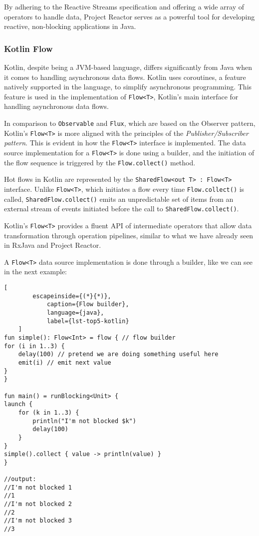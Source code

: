 By adhering to the Reactive Streams specification and offering a wide array of operators to handle data, Project Reactor serves as a powerful tool for developing reactive, non-blocking applications in Java.

\subsubsection{Kotlin Flow}
\label{sec:kotlinflow}

Kotlin, despite being a JVM-based language, differs significantly from Java when it comes to handling asynchronous data flows. Kotlin uses coroutines, a feature natively supported in the language, to simplify asynchronous programming. This feature is used in the implementation of \texttt{Flow<T>}, Kotlin's main interface for handling asynchronous data flows.

In comparison to \texttt{Observable} and \texttt{Flux}, which are based on the Observer pattern, Kotlin's \texttt{Flow<T>} is more aligned with the principles of the \textit{Publisher/Subscriber pattern}. This is evident in how the \texttt{Flow<T>} interface is implemented. The data source implementation for a \texttt{Flow<T>} is done using a builder, and the initiation of the flow sequence is triggered by the \texttt{Flow.collect()} method.

Hot flows in Kotlin are represented by the \texttt{SharedFlow<out T> : Flow<T>} interface. Unlike \texttt{Flow<T>}, which initiates a flow every time \texttt{Flow.collect()} is called, \texttt{SharedFlow.collect()} emits an unpredictable set of items from an external stream of events initiated before the call to \texttt{SharedFlow.collect()}. 

Kotlin's \texttt{Flow<T>} provides a fluent API of intermediate operators that allow data transformation through operation pipelines, similar to what we have already seen in RxJava and Project Reactor. 

A \texttt{Flow<T>} data source implementation is done through a builder, like we can see in the next example:


\begin{center}
	\lstset{basicstyle=\scriptsize\ttfamily,frame=bottomline}
	\begin{lstlisting}[
		escapeinside={(*}{*)},
			caption={Flow builder},
			language={java},
			label={lst-top5-kotlin}
	]
fun simple(): Flow<Int> = flow { // flow builder
for (i in 1..3) {
	delay(100) // pretend we are doing something useful here
	emit(i) // emit next value
}
}

fun main() = runBlocking<Unit> {
launch {
	for (k in 1..3) {
		println("I'm not blocked $k")
		delay(100)
	}
}
simple().collect { value -> println(value) } 
}

//output:
//I'm not blocked 1
//1
//I'm not blocked 2
//2
//I'm not blocked 3
//3
	
	\end{lstlisting}
\end{center}



